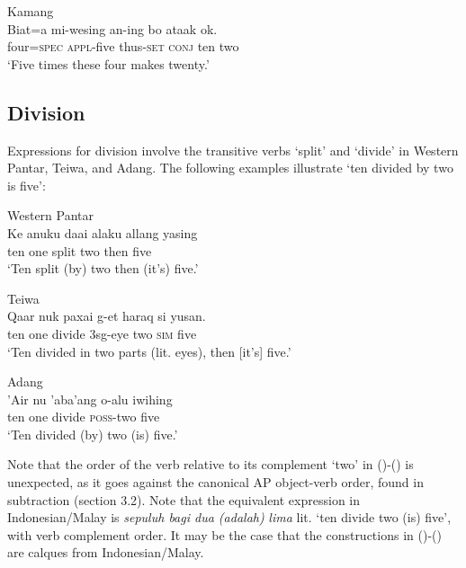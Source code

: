 \ea%
\label{bkm:Ref358043179}
Kamang\\
\gll   Biat=a  mi-wesing  an-ing  bo  ataak   ok.  \\
    four=\textsc{spec}  \textsc{appl-}five  thus\textsc{-set}  \textsc{conj} ten  two   \\
\glt  `Five times these four makes twenty.'
\z


\subsection{Division}
Expressions for division involve the transitive verbs `split' and `divide' in Western Pantar, Teiwa, and Adang. The following examples illustrate `ten divided by two is five':


\ea%
\label{bkm:Ref342664493}
Western  Pantar\\
\gll   Ke anuku  daai  alaku  allang  yasing\\
    ten one  split  two  then  five \\
\glt `Ten split (by) two then (it's) five.'
\z








\ea
Teiwa\\
 \gll Qaar  nuk  paxai  g-et  haraq  si  yusan.   \\
  ten  one  divide  3sg-eye  two  \textsc{sim}  five   \\
 \glt `Ten divided in two parts (lit. eyes), then [it's] five.'
\z


\ea%
\label{bkm:Ref342664505}
Adang\\
\gll  'Air nu  'aba'ang  o-alu  iwihing\\
    ten one  divide  \textsc{poss-}two  five \\
\glt `Ten divided (by) two (is) five.'
\z







Note that the order of the verb relative to its complement `two' in ()-() is unexpected, as it goes against the canonical AP object-verb order, found in subtraction (section 3.2). Note that the equivalent expression in Indonesian/Malay is \textit{sepuluh bagi dua (adalah)} \textit{lima} lit. `ten divide two (is) five', with verb complement order. It may be the case that the constructions in ()-() are calques from Indonesian/Malay.

